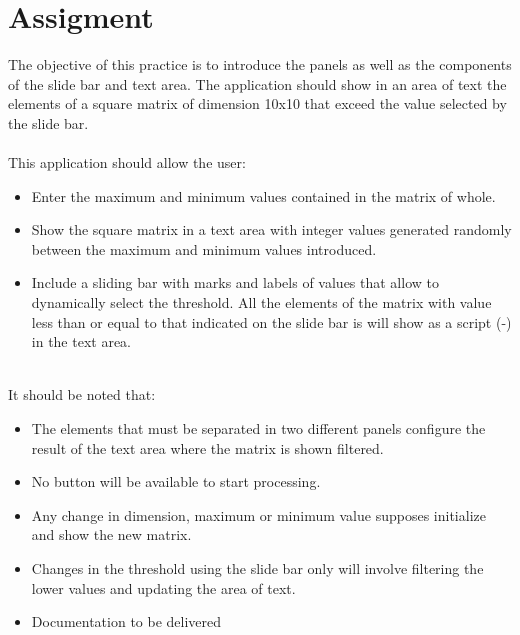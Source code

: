 \documentclass[12pt]{report}
\begin{document}
\chapter{Assigment}
\label{chap:assig}
The objective of this practice is to introduce the panels as well as the components of the slide bar and text area. The application should show in an area of text the elements of a square matrix of dimension 10x10 that exceed the value selected by the slide bar.
\\ \\
This application should allow the user:
\begin{itemize}
\item Enter the maximum and minimum values contained in the matrix of whole.
\item Show the square matrix in a text area with integer values generated randomly between the maximum and minimum values introduced.
\item Include a sliding bar with marks and labels of values that allow to dynamically select the threshold. All the elements of the matrix with value less than or equal to that indicated on the slide bar is will show as a script (-) in the text area.
\end{itemize}
\\
It should be noted that:
\begin{itemize}
    \item The elements that must be separated in two different panels configure the result of the text area where the matrix is shown filtered.
    \item No button will be available to start processing.
    \item Any change in dimension, maximum or minimum value supposes initialize and show the new matrix.
    \item Changes in the threshold using the slide bar only will involve filtering the lower values and updating the area of text.
    \item Documentation to be delivered
\end{itemize}
%
%
\end{document}
